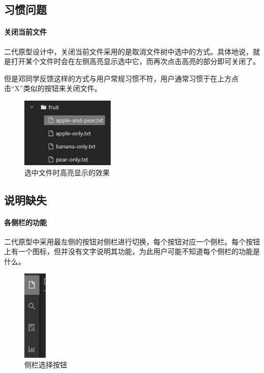 \documentclass[scheme = chinese]{ctexart}
\begin{document}
\subsection{习惯问题}
\paragraph{关闭当前文件}
二代原型设计中，关闭当前文件采用的是取消文件树中选中的方式。具体地说，就是打开某个文件时会在左侧高亮显示选中它，而再次点击高亮的部分即可关闭了。

但是邓同学反馈这样的方式与用户常规习惯不符，用户通常习惯于在上方点击“X”类似的按钮来关闭文件。

\begin{figure}[h]
    \centering
    \includegraphics[width=0.4\textwidth]{images/问题-关闭当前文件.png}
    \caption{选中文件时高亮显示的效果}
\end{figure}

\clearpage

\subsection{说明缺失}
\paragraph{各侧栏的功能}
二代原型中采用最左侧的按钮对侧栏进行切换，每个按钮对应一个侧栏。每个按钮上有一个图标，但并没有文字说明其功能，为此用户可能不知道每个侧栏的功能是什么。

\begin{figure}[h]
    \centering
    \includegraphics[width=0.1\textwidth]{images/问题-各侧栏功能.png}
    \caption{侧栏选择按钮}
\end{figure}
\end{document}
